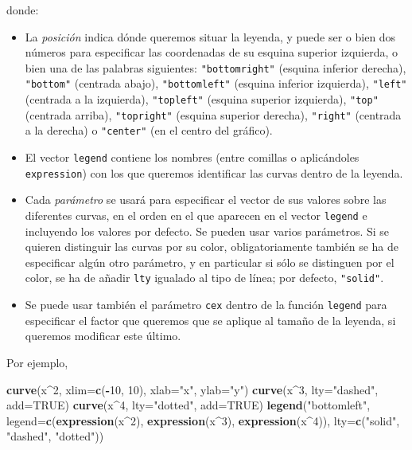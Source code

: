 \documentclass[]{book}
\newenvironment{Shaded}{\begin{snugshade}}{\end{snugshade}}
\newcommand{\DataTypeTok}[1]{\textcolor[rgb]{0.13,0.29,0.53}{#1}}
\newcommand{\DecValTok}[1]{\textcolor[rgb]{0.00,0.00,0.81}{#1}}
\newcommand{\KeywordTok}[1]{\textcolor[rgb]{0.13,0.29,0.53}{\textbf{#1}}}
\newcommand{\NormalTok}[1]{#1}
\newcommand{\OperatorTok}[1]{\textcolor[rgb]{0.81,0.36,0.00}{\textbf{#1}}}
\newcommand{\OtherTok}[1]{\textcolor[rgb]{0.56,0.35,0.01}{#1}}
\newcommand{\StringTok}[1]{\textcolor[rgb]{0.31,0.60,0.02}{#1}}
\theoremstyle{definition}
\theoremstyle{definition}
\theoremstyle{definition}
\theoremstyle{remark}
\begin{document}
donde:

\begin{itemize}
\item
  La \emph{posición} indica dónde queremos situar la leyenda, y puede ser o bien dos números para especificar las coordenadas de su esquina superior izquierda, o bien una de las palabras siguientes: \texttt{"bottomright"} (esquina inferior derecha), \texttt{"bottom"} (centrada abajo), \texttt{"bottomleft"} (esquina inferior izquierda), \texttt{"left"} (centrada a la izquierda), \texttt{"topleft"} (esquina superior izquierda), \texttt{"top"} (centrada arriba), \texttt{"topright"} (esquina superior derecha), \texttt{"right"} (centrada a la derecha) o \texttt{"center"} (en el centro del gráfico).
\item
  El vector \texttt{legend} contiene los nombres (entre comillas o aplicándoles \texttt{expression}) con los que queremos identificar las curvas dentro de la leyenda.
\item
  Cada \emph{parámetro} se usará para especificar el vector de sus valores sobre las diferentes curvas, en el orden en el que aparecen en el vector \texttt{legend} e incluyendo los valores por defecto. Se pueden usar varios parámetros. Si se quieren distinguir las curvas por su color, obligatoriamente también se ha de especificar algún otro parámetro, y en particular si sólo se distinguen por el color, se ha de añadir \texttt{lty} igualado al tipo de línea; por defecto, \texttt{"solid"}.
\item
  Se puede usar también el parámetro \texttt{cex} dentro de la función \texttt{legend} para especificar el factor que queremos que se aplique al tamaño de la leyenda, si queremos modificar este último.
\end{itemize}

Por ejemplo,

\begin{Shaded}
\begin{Highlighting}[]
\KeywordTok{curve}\NormalTok{(x}\OperatorTok{^}\DecValTok{2}\NormalTok{, }\DataTypeTok{xlim=}\KeywordTok{c}\NormalTok{(}\OperatorTok{-}\DecValTok{10}\NormalTok{, }\DecValTok{10}\NormalTok{), }\DataTypeTok{xlab=}\StringTok{"x"}\NormalTok{, }\DataTypeTok{ylab=}\StringTok{"y"}\NormalTok{)}
\KeywordTok{curve}\NormalTok{(x}\OperatorTok{^}\DecValTok{3}\NormalTok{, }\DataTypeTok{lty=}\StringTok{"dashed"}\NormalTok{, }\DataTypeTok{add=}\OtherTok{TRUE}\NormalTok{)}
\KeywordTok{curve}\NormalTok{(x}\OperatorTok{^}\DecValTok{4}\NormalTok{, }\DataTypeTok{lty=}\StringTok{"dotted"}\NormalTok{, }\DataTypeTok{add=}\OtherTok{TRUE}\NormalTok{) }
\KeywordTok{legend}\NormalTok{(}\StringTok{"bottomleft"}\NormalTok{, }\DataTypeTok{legend=}\KeywordTok{c}\NormalTok{(}\KeywordTok{expression}\NormalTok{(x}\OperatorTok{^}\DecValTok{2}\NormalTok{), }\KeywordTok{expression}\NormalTok{(x}\OperatorTok{^}\DecValTok{3}\NormalTok{), }\KeywordTok{expression}\NormalTok{(x}\OperatorTok{^}\DecValTok{4}\NormalTok{)), }
       \DataTypeTok{lty=}\KeywordTok{c}\NormalTok{(}\StringTok{"solid"}\NormalTok{, }\StringTok{"dashed"}\NormalTok{, }\StringTok{"dotted"}\NormalTok{))}
\end{Highlighting}
\end{Shaded}
\end{document}
